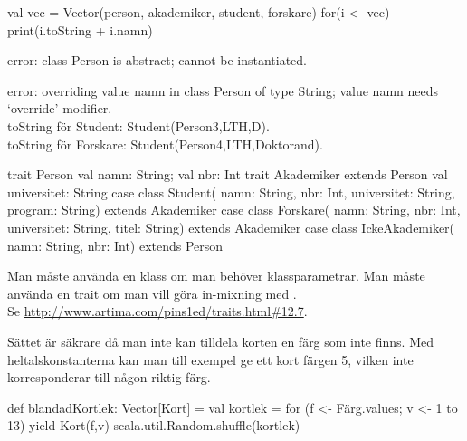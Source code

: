 \Subtask
\begin{Code}
val vec = Vector(person, akademiker, student, forskare)
for(i <- vec){ print(i.toString + i.namn) }
\end{Code}

\Subtask error: class Person is abstract; cannot be instantiated.

\Subtask error: overriding value namn in class Person of type String; value namn needs `override' modifier.\\ 
toString för Student: Student(Person3,LTH,D). \\
toString för Forskare: Student(Person4,LTH,Doktorand). 

\Subtask
\begin{Code}
trait Person {val namn: String; val nbr: Int}
trait Akademiker extends Person {val universitet: String} 
case class Student(
  namn: String,
  nbr: Int,
  universitet: String,
  program: String) extends Akademiker
case class Forskare(
  namn: String,
  nbr: Int,
  universitet: String,
  titel: String) extends Akademiker
case class IckeAkademiker(
    namn: String,
    nbr: Int) extends Person
\end{Code}

\Subtask Man måste använda en klass om man behöver klassparametrar. Man måste använda en trait om man vill göra in-mixning med . \\
 Se \href{http://www.artima.com/pins1ed/traits.html\#12.7}{http://www.artima.com/pins1ed/traits.html\#12.7}.

\Task

\Subtask Sättet är säkrare då man inte kan tilldela korten en färg som inte finns. Med heltalskonstanterna kan man till exempel ge ett kort färgen 5, vilken inte korresponderar till någon riktig färg.

\Subtask {}

\Subtask
\begin{Code}
def blandadKortlek: Vector[Kort] = {
  val kortlek = 
    for (f <- Färg.values; v <- 1 to 13) yield Kort(f,v)
  scala.util.Random.shuffle(kortlek)
}
\end{Code}

\Subtask {}

\ExtraTasks %

\Task 

